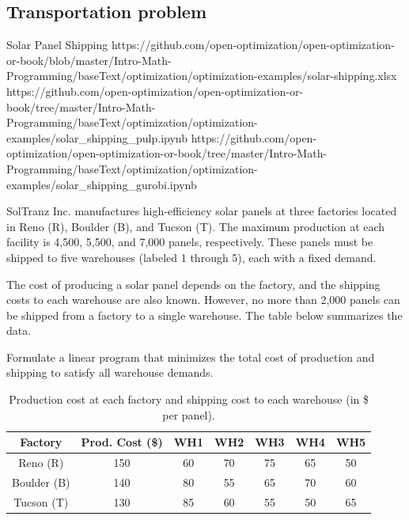 \subsection{Transportation problem}
\begin{examplewithallcode}{Solar Panel Shipping}
{https://github.com/open-optimization/open-optimization-or-book/blob/master/Intro-Math-Programming/baseText/optimization/optimization-examples/solar-shipping.xlsx}
{https://github.com/open-optimization/open-optimization-or-book/tree/master/Intro-Math-Programming/baseText/optimization/optimization-examples/solar_shipping_pulp.ipynb}
{https://github.com/open-optimization/open-optimization-or-book/tree/master/Intro-Math-Programming/baseText/optimization/optimization-examples/solar_shipping_gurobi.ipynb}

SolTranz Inc. manufactures high-efficiency solar panels at three factories located in Reno (R), Boulder (B), and Tucson (T). The maximum production at each facility is 4,500, 5,500, and 7,000 panels, respectively. These panels must be shipped to five warehouses (labeled 1 through 5), each with a fixed demand.

The cost of producing a solar panel depends on the factory, and the shipping costs to each warehouse are also known. However, no more than 2,000 panels can be shipped from a factory to a single warehouse. The table below summarizes the data.

Formulate a linear program that minimizes the total cost of production and shipping to satisfy all warehouse demands.

\end{examplewithallcode}

\begin{table}[h!] \begin{center} \begin{tabular} {|c|c|c|c|c|c|c|}
\hline Factory  & Prod. Cost (\$) & WH1 & WH2 & WH3 & WH4 & WH5 \\ \hline
\hline Reno (R)     & 150     & 60  & 70  & 75  & 65  & 50 \\
\hline Boulder (B)  & 140     & 80  & 55  & 65  & 70  & 60 \\
\hline Tucson (T)   & 130     & 85  & 60  & 55  & 50  & 65 \\
\hline
\end{tabular} \end{center} \caption{Production cost at each factory and shipping cost to each warehouse (in \$ per panel).}\label{tab:modeling-linear-programming-tab10}%
\end{table}

